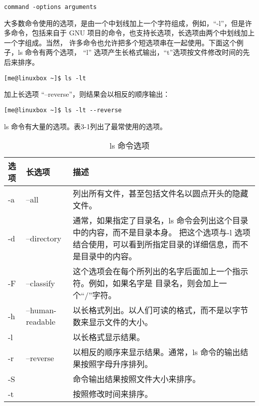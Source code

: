 \begin{lstlisting}
command -options arguments
\end{lstlisting}

\par 大多数命令使用的选项，是由一个中划线加上一个字符组成，例如，“-l”，但是许多命令，包括来自于 GNU 项目的命令，也支持长选项，长选项由两个中划线加上一个字组成。当然， 许多命令也允许把多个短选项串在一起使用。下面这个例子，ls 命令有两个选项， “l” 选项产生长格式输出，“t”选项按文件修改时间的先后来排序。

\begin{lstlisting}
[me@linuxbox ~]$ ls -lt
\end{lstlisting}

\par 加上长选项 “–reverse”，则结果会以相反的顺序输出：

\begin{lstlisting}
[me@linuxbox ~]$ ls -lt --reverse
\end{lstlisting}

\par ls 命令有大量的选项。表3-1列出了最常使用的选项。

\begin{table}[ht!]
\caption{ls 命令选项}
\label{table_example}
\centering
\begin{tabular}{p{1.5cm}p{3.5cm}p{10cm}}
\hline
 选项 & 长选项 & 描述 \\
\hline
 -a & --all & 列出所有文件，甚至包括文件名以圆点开头的隐藏文件。 \\
-d & --directory & 通常，如果指定了目录名，ls 命令会列出这个目录中的内容，而不是目录本身。 把这个选项与-l 选项结合使用，可以看到所指定目录的详细信息，而不是目录中的内容。\\
-F & --classify	& 这个选项会在每个所列出的名字后面加上一个指示符。例如，如果名字是 目录名，则会加上一个``/''字符。 \\
-h & --human-readable & 以长格式列出。以人们可读的格式，而不是以字节数来显示文件的大小。\\
-l & & 以长格式显示结果。\\
-r & --reverse & 以相反的顺序来显示结果。通常，ls 命令的输出结果按照字母升序排列。 \\
-S & & 命令输出结果按照文件大小来排序。\\
-t & & 按照修改时间来排序。\\
\hline
\end{tabular}
\end{table}


